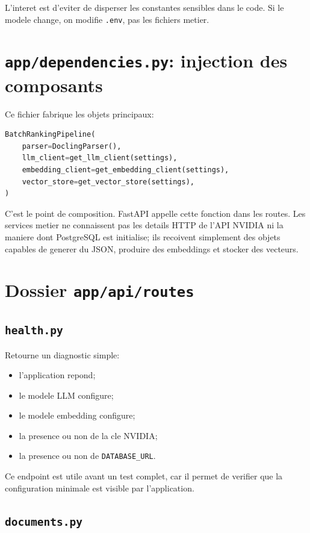 \documentclass[12pt,a4paper]{article}
\begin{document}
L'interet est d'eviter de disperser les constantes sensibles dans le code. Si le modele change, on modifie \texttt{.env}, pas les fichiers metier.

\section{\texttt{app/dependencies.py}: injection des composants}

Ce fichier fabrique les objets principaux:

\begin{lstlisting}[style=smartcode,language=Python]
BatchRankingPipeline(
    parser=DoclingParser(),
    llm_client=get_llm_client(settings),
    embedding_client=get_embedding_client(settings),
    vector_store=get_vector_store(settings),
)
\end{lstlisting}

C'est le point de composition. FastAPI appelle cette fonction dans les routes. Les services metier ne connaissent pas les details HTTP de l'API NVIDIA ni la maniere dont PostgreSQL est initialise; ils recoivent simplement des objets capables de generer du JSON, produire des embeddings et stocker des vecteurs.

\section{Dossier \texttt{app/api/routes}}

\subsection{\texttt{health.py}}

Retourne un diagnostic simple:

\begin{itemize}
  \item l'application repond;
  \item le modele LLM configure;
  \item le modele embedding configure;
  \item la presence ou non de la cle NVIDIA;
  \item la presence ou non de \texttt{DATABASE\_URL}.
\end{itemize}

Ce endpoint est utile avant un test complet, car il permet de verifier que la configuration minimale est visible par l'application.

\subsection{\texttt{documents.py}}
\end{document}
